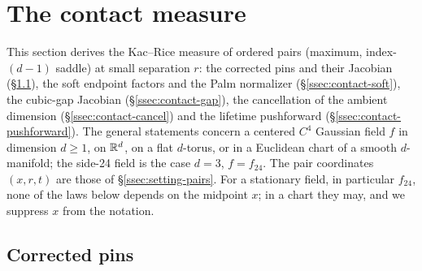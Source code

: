 \section{The contact measure}\label{sec:contact}

This section derives the Kac--Rice measure of ordered pairs (maximum, index-$(d-1)$ saddle) at small separation $r$: the corrected pins and their Jacobian (\S\ref{ssec:contact-pins}), the soft endpoint factors and the Palm normalizer (\S\ref{ssec:contact-soft}), the cubic-gap Jacobian (\S\ref{ssec:contact-gap}), the cancellation of the ambient dimension (\S\ref{ssec:contact-cancel}) and the lifetime pushforward (\S\ref{ssec:contact-pushforward}). The general statements concern a centered $C^4$ Gaussian field $f$ in dimension $d\ge1$, on $\mathbb R^d$, on a flat $d$-torus, or in a Euclidean chart of a smooth $d$-manifold; the side-24 field is the case $d=3$, $f=f_{24}$. The pair coordinates $(x,r,t)$ are those of \S\ref{ssec:setting-pairs}. For a stationary field, in particular $f_{24}$, none of the laws below depends on the midpoint $x$; in a chart they may, and we suppress $x$ from the notation.

\subsection{Corrected pins}\label{ssec:contact-pins}


